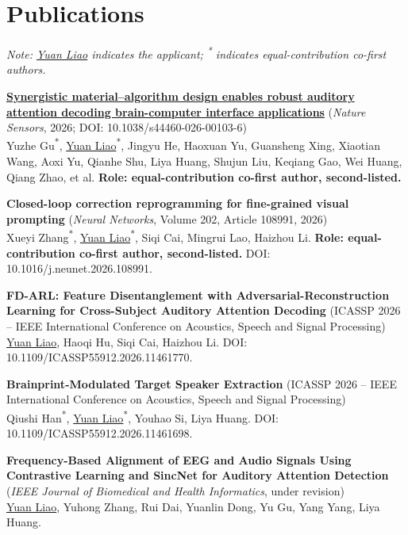 \documentclass[letterpaper,10pt]{article}
\newcommand{\publication}[3]{
	\item \small{
		\textbf{#1} #2\\
		#3
	}\vspace{-2pt}
}
\begin{document}
	\section{Publications}
	\begin{itemize}[leftmargin=0.15in]
		
		\small{\item[] \textit{Note: \underline{Yuan Liao} indicates the applicant; \textsuperscript{*} indicates equal-contribution co-first authors.}}
		
		\publication
		{\href{https://www.nature.com/articles/s44460-026-00103-6}{Synergistic material--algorithm design enables robust auditory attention decoding brain-computer interface applications}}
		{(\textit{Nature Sensors}, 2026; DOI: 10.1038/s44460-026-00103-6)}
		{Yuzhe Gu\textsuperscript{*}, \underline{Yuan Liao}\textsuperscript{*}, Jingyu He, Haoxuan Yu, Guansheng Xing, Xiaotian Wang, Aoxi Yu, Qianhe Shu, Liya Huang, Shujun Liu, Keqiang Gao, Wei Huang, Qiang Zhao, et al. \textbf{Role: equal-contribution co-first author, second-listed.}}
		
		\publication
		{Closed-loop correction reprogramming for fine-grained visual prompting}
		{(\textit{Neural Networks}, Volume 202, Article 108991, 2026)}
		{Xueyi Zhang\textsuperscript{*}, \underline{Yuan Liao}\textsuperscript{*}, Siqi Cai, Mingrui Lao, Haizhou Li. \textbf{Role: equal-contribution co-first author, second-listed.} DOI: 10.1016/j.neunet.2026.108991.}
		
		\publication
		{FD-ARL: Feature Disentanglement with Adversarial-Reconstruction Learning for Cross-Subject Auditory Attention Decoding}
		{(ICASSP 2026 -- IEEE International Conference on Acoustics, Speech and Signal Processing)}
		{\underline{Yuan Liao}, Haoqi Hu, Siqi Cai, Haizhou Li. DOI: 10.1109/ICASSP55912.2026.11461770.}
		
		\publication
		{Brainprint-Modulated Target Speaker Extraction}
		{(ICASSP 2026 -- IEEE International Conference on Acoustics, Speech and Signal Processing)}
		{Qiushi Han\textsuperscript{*}, \underline{Yuan Liao}\textsuperscript{*}, Youhao Si, Liya Huang. DOI: 10.1109/ICASSP55912.2026.11461698.}
		
		\publication
		{Frequency-Based Alignment of EEG and Audio Signals Using Contrastive Learning and SincNet for Auditory Attention Detection}
		{(\textit{IEEE Journal of Biomedical and Health Informatics}, under revision)}
		{\underline{Yuan Liao}, Yuhong Zhang, Rui Dai, Yuanlin Dong, Yu Gu, Yang Yang, Liya Huang.}
		

\end{itemize}
\end{document}
